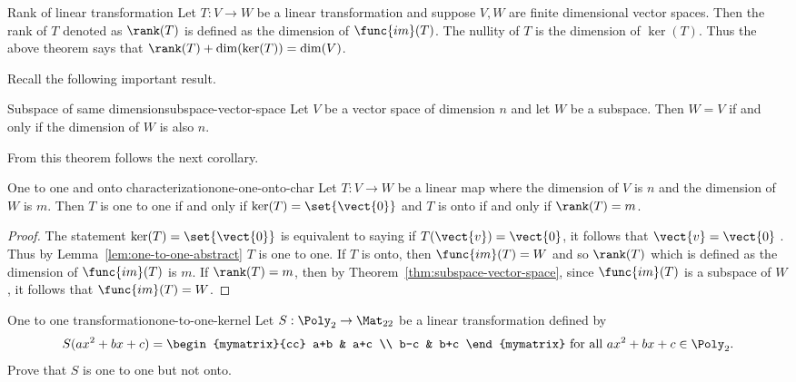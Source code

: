 \begin{definition}{Rank of linear transformation}{}
Let $T:V\rightarrow W$ be a linear transformation and suppose $V,W$ are finite dimensional vector spaces. Then
the rank of $T$ denoted as $\rank(T) $ is defined as the
dimension of $\func{im}(T)$. The nullity of $T$ is the
dimension of $\ker (T)$. Thus the above theorem says that $
\rank(T) +\dim (\ker (T)) =\dim
(V)$.
\end{definition}

Recall the following important result.

\begin{theorem}{Subspace of same dimension}{subspace-vector-space}
Let $V$ be a vector space of dimension $n$ and let $W$ be a
subspace. Then $W=V$ if and only if the dimension of $W$ is also $n$.
\end{theorem}

From this theorem follows the next corollary.

\begin{corollary}{One to one and onto characterization}{one-one-onto-char}
Let $T:V\rightarrow W$ be a linear map where the dimension of $V$ is $n$ and
the dimension of $W$ is $m$. Then $T$ is one to one if and only if $\ker
(T) =\set{\vect{0}} $ and $T$ is onto if and only if $
\rank(T) =m$.
\end{corollary}

\begin{proof}
The statement $\ker (T) =\set{\vect{0}} $
is equivalent to saying if $T (\vect{v})=\vect{0}$, it follows that $\vect{v}=\vect{0}$
. Thus by Lemma~\ref{lem:one-to-one-abstract} $T$ is one to one. If $T$ is onto, then $
\func{im}(T) =W$ and so $\rank(T) $ which is
defined as the dimension of $\func{im}(T) $ is $m$. If $\rank(T) =m$, then by Theorem~\ref{thm:subspace-vector-space}, since $\func{im}
(T) $ is a subspace of $W$, it follows that $\func{im}(
T) =W$.
\end{proof}

\begin{example}{One to one transformation}{one-to-one-kernel}
Let $S:\Poly_2\to\Mat_{22}$ be a linear transformation
defined by
\[ S(ax^2+bx+c)
=
\begin{mymatrix}{cc}
a+b & a+c \\ b-c & b+c \end{mymatrix}
\mbox{ for all }
 ax^2+bx+c\in \Poly_2.\]
Prove that $S$ is one to one but not onto.
\end{example}

